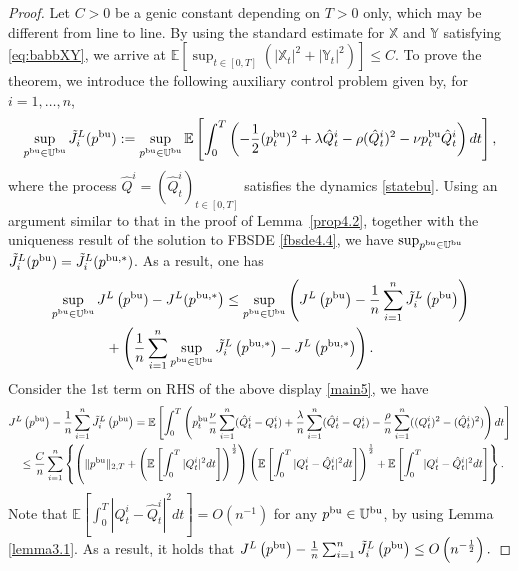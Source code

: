 \documentclass[11pt]{article}
\numberwithin{equation}{section}
\begin{document}
\begin{proof}
Let $C>0$ be a genic constant depending on $T>0$ only, which may be different from line to line. By using the standard estimate for $\mathbb{X}$ and $\mathbb{Y}$ satisfying \eqref{eq:babbXY}, we arrive at $\mathbb{E}[\sup_{t\in [0,T]}(|\mathbb{X}_t|^2+|\mathbb{Y}_t|^2)]\leq C$. 
To prove the theorem, we introduce the following auxiliary control problem given by, for $i=1,\ldots,n$,
\begin{align}\label{aux3}
\sup_{p^{{\rm bu}}\in\mathbb{U}^{\rm bu}}\tilde{J}_i^L(p^{{\rm bu}}):=\sup_{p^{{\rm bu}}\in\mathbb{U}^{\rm bu}}\mathbb{E}\left[\int_0^T\left(-\frac{1}{2}(p_t^{{\rm bu}})^2+\lambda \hat{Q}_t^i-\rho (\hat{Q}_t^i)^2-\nu p_t^{{\rm bu}} \hat{Q}_t^i\right)dt\right],
\end{align}
where the process $\hat{Q}^i=(\hat{Q}_t^i)_{t\in[0,T]}$ satisfies the dynamics \eqref{statebu}.
 Using an argument similar to that in the proof of Lemma~\ref{prop4.2}, together with the uniqueness result of the solution to FBSDE \eqref{fbsde4.4}, we have $\sup_{p^{{\rm bu}}\in\mathbb{U}^{\rm bu}}$ $\tilde{J}_i^L(p^{{\rm bu}})=\tilde{J}_i^L(p^{{\rm bu},*})$. As a result, one has
\begin{align}\label{main5}
&\sup_{p^{{\rm bu}}\in\mathbb{U}^{\rm bu}}J^L\left(p^{{\rm bu}})-J^L(p^{{\rm bu},*}\right)\leq \sup_{p^{{\rm bu}}\in\mathbb{U}^{\rm bu}}\left(J^L\left(p^{{\rm bu}}\right)-\frac{1}{n}\sum_{i=1}^n\tilde{J}_i^L\left(p^{{\rm bu}}\right)\right)\nonumber\\
&\qquad\qquad+\left(\frac{1}{n}\sum_{i=1}^n\sup_{p^{{\rm bu}}\in\mathbb{U}^{\rm bu}}\tilde{J}_i^L\left(p^{{\rm bu},*}\right)-J^L\left(p^{{\rm bu},*}\right)\right).
\end{align}
Consider the 1st term on RHS of the above display \eqref{main5}, we have
{\small\begin{align*}
&J^L\left(p^{{\rm bu}}\right)-\frac{1}{n}\sum_{i=1}^n\tilde{J}_i^L\left(p^{{\rm bu}}\right)=\mathbb{E}\left[\int_0^T\left(p_t^{{\rm bu}}\frac{\nu}{n}\sum_{i=1}^n(\hat{Q}_t^i-Q_t^i)+\frac{\lambda}{n}\sum_{i=1}^n(\hat{Q}_t^i-Q_t^i)-\frac{\rho}{n}\sum_{i=1}^n((Q_t^i)^2-(\hat{Q}_t^i)^2)\right)dt\right]\\
&\quad\leq \frac{C}{n}\sum_{i=1}^n\left\{\left(\Vert p^{{\rm bu}}\Vert_{2,T}+\left( \mathbb{E}\left[\int_0^T|Q_t^i|^2dt\right]\right)^{\frac{1}{2}}\right)\left( \mathbb{E}\left[\int_0^T|Q_t^i-\hat{Q}_t^i|^2dt\right]\right)^{\frac{1}{2}} +\mathbb{E}\left[\int_0^T|Q_t^i-\hat{Q}_t^i|^2dt\right]\right\}.
\end{align*}}Note that $\mathbb{E}[\int_0^T|Q_t^i-\hat{Q}_t^i|^2dt]=O(n^{-1})$ for any $p^{{\rm bu}}\in\mathbb{U}^{\rm bu}$, by using Lemma \ref{lemma3.1}. As a result, it holds that
$J^L\left(p^{{\rm bu}}\right)-\frac{1}{n}\sum_{i=1}^n\tilde{J}_i^L\left(p^{{\rm bu}}\right)\leq O\left(n^{-\frac{1}{2}}\right).$


\end{proof}
\end{document}
